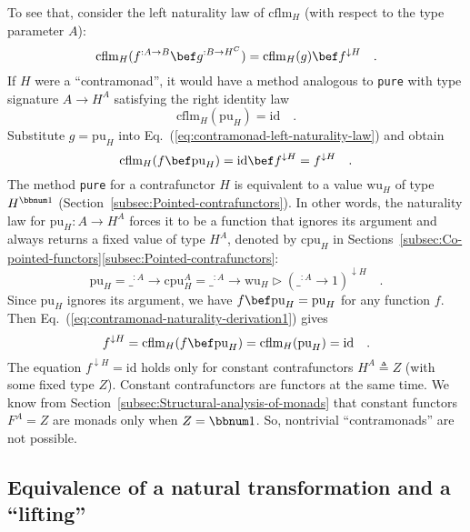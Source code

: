 To see that, consider the left naturality law of $\text{cflm}_{H}$
(with respect to the type parameter $A$):
\begin{equation}
\text{cflm}_{H}(f^{:A\rightarrow B}\bef g^{:B\rightarrow H^{C}})=\text{cflm}_{H}(g)\bef f^{\downarrow H}\quad.\label{eq:contramonad-left-naturality-law}
\end{equation}
If $H$ were a \textsf{``}contramonad\textsf{''}, it would have a method analogous
to \lstinline!pure! with type signature $A\rightarrow H^{A}$ satisfying
the right identity law
\[
\text{cflm}_{H}(\text{pu}_{H})=\text{id}\quad.
\]
Substitute $g=\text{pu}_{H}$ into Eq.~(\ref{eq:contramonad-left-naturality-law})
and obtain
\begin{equation}
\text{cflm}_{H}(f\bef\text{pu}_{H})=\text{id}\bef f^{\downarrow H}=f^{\downarrow H}\quad.\label{eq:contramonad-naturality-derivation1}
\end{equation}
The method \lstinline!pure! for a contrafunctor $H$ is equivalent
to a value $\text{wu}_{H}$ of type $H^{\bbnum 1}$ (Section~\ref{subsec:Pointed-contrafunctors}).
In other words, the naturality law for $\text{pu}_{H}:A\rightarrow H^{A}$
forces it to be a function that ignores its argument and always returns
a fixed value of type $H^{A}$, denoted by $\text{cpu}_{H}$ in Sections~\ref{subsec:Co-pointed-functors}\textendash \ref{subsec:Pointed-contrafunctors}:
\[
\text{pu}_{H}=\_^{:A}\rightarrow\text{cpu}_{H}^{A}=\_^{:A}\rightarrow\text{wu}_{H}\triangleright(\_^{:A}\rightarrow1)^{\downarrow H}\quad.
\]
Since $\text{pu}_{H}$ ignores its argument, we have $f\bef\text{pu}_{H}=\text{pu}_{H}$
for any function $f$. Then Eq.~(\ref{eq:contramonad-naturality-derivation1})
gives
\[
f^{\downarrow H}=\text{cflm}_{H}(f\bef\text{pu}_{H})=\text{cflm}_{H}(\text{pu}_{H})=\text{id}\quad.
\]
The equation $f^{\downarrow H}=\text{id}$ holds only for constant
contrafunctors $H^{A}\triangleq Z$ (with some fixed type $Z$). Constant
contrafunctors are functors at the same time. We know from Section~\ref{subsec:Structural-analysis-of-monads}
that constant functors $F^{A}=Z$ are monads only when $Z=\bbnum 1$.
So, nontrivial \textsf{``}contramonads\textsf{''} are not possible. 

\subsection{Equivalence of a natural transformation and a \textsf{``}lifting\textsf{''}}

